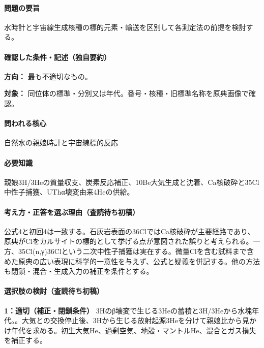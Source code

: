 \paragraph{問題の要旨} 水時計と宇宙線生成核種の標的元素・輸送を区別して各測定法の前提を検討する。

\paragraph{確認した条件・記述（独自要約）}\mbox{}\par

\noindent\textbf{方向：} 最も不適切なもの。\par

\noindent\textbf{対象：} 同位体の標準・分別又は年代。番号・核種・旧標準名称を原典画像で確認。\par

\paragraph{問われる核心} 自然水の親娘時計と宇宙線標的反応

\paragraph{必要知識} 親娘3H/3Heの質量収支、炭素反応補正、10Be大気生成と沈着、Ca核破砕と35Cl中性子捕獲、UThα壊変由来4Heの供給。

\paragraph{考え方・正答を選ぶ理由（査読待ち初稿）} 公式4と初回4は一致する。石灰岩表面の36ClではCa核破砕が主要経路であり、原典がClをカルサイトの標的として挙げる点が意図された誤りと考えられる。一方、35Cl(n,γ)36Clという二次中性子捕獲は実在する。微量Clを含む試料まで含めた原典の広い表現に科学的一意性を与えず、公式と疑義を併記する。他の方法も閉鎖・混合・生成入力の補正を条件とする。

\paragraph{選択肢の検討（査読待ち初稿）}\mbox{}\par

\noindent\textbf{1：適切（補正・閉鎖条件）} 3Hのβ壊変で生じる3Heの蓄積と3H/3Heから水塊年代。。大気との交換停止後、3Hから生じる放射起源3Heを分けて親娘比から見かけ年代を求める。初生大気He、過剰空気、地殻・マントルHe、混合とガス損失を補正する。\par

